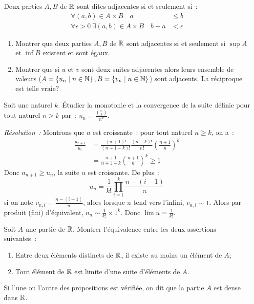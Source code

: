 \begin{exercice}
    Deux parties \(A, B\) de \(\mathbb{R}\) sont dites adjacentes si et seulement si~:
    \begin{align}
        \forall (a,b) \in A \times B \quad a & \leqslant b \\       
        \forall \epsilon >0 \ \exists (a,b) \in A \times B \quad b-a & < \epsilon
    \end{align}
    \begin{enumerate}
        \item Montrer que deux parties \(A, B\) de \(\mathbb{R}\) sont adjacentes si et seulement si \(\sup A\) et \(\inf B\) existent et sont égaux.
        \item Montrer que si \(u\) et \(v\) sont deux suites adjacentes alors leurs ensemble de valeurs (\(A=\left\{u_n\mathrel{}\middle|\mathrel{}n\in\mathbb{N}\right\}, B=\left\{v_n\mathrel{}\middle|\mathrel{}n\in\mathbb{N}\right\}\)) sont adjacents. La réciproque est telle vraie?
    \end{enumerate}
\end{exercice}
\begin{exercice}
    Soit une naturel \(k\). Étudier la monotonie et la convergence de la suite définie pour tout naturel \(n \geqslant k\) par~: \(u_n =\frac{\binom{n}{k}}{n^k}\).
\end{exercice}
\emph{Résolution~:}
Montrons que \(u\) est croissante~: pour tout naturel \(n\geqslant k\), on a~:
\begin{align*}
    \frac{u_{n+1}}{u_n} &= \frac{(n+1)!}{(n+1-k)!}\frac{(n-k)!}{n!} \left(\frac{n+1}{n}\right)^k \\
                        &= \frac{n+1}{n+1-k}\left(\frac{n+1}{n}\right)^k \geqslant 1
\end{align*}
Donc \(u_{n+1} \geqslant u_n\), la suite \(u\) est croissante. De plus~:
\[u_n = \frac{1}{k!} \prod_{i=1}^k \frac{n-(i-1)}{n}\]
si on note \(v_{n,i} = \frac{n-(i-1)}{n}\), alors lorsque \(n\) tend vers l'infini, \(v_{n,i} \sim 1\). Alors par produit (fini) d'équivalent, \(u_n \sim \frac{1}{k!} \times 1^k\). Donc \(\lim u = \frac{1}{k!}\).
\begin{exercice}[Densité]
    Soit \(A\) une partie de \(\mathbb{R}\). Montrer l'équivalence entre les deux assertions suivantes~:
    \begin{enumerate}
        \item Entre deux éléments distincts de \(\mathbb{R}\), il existe au moins un élément de \(A\);
        \item Tout élément de \(\mathbb{R}\) est limite d'une suite d'éléments de \(A\).
    \end{enumerate}
    Si l'une ou l'autre des propositions est vérifiée, on dit que la partie \(A\) est dense dans \(\mathbb{R}\).
\end{exercice}
